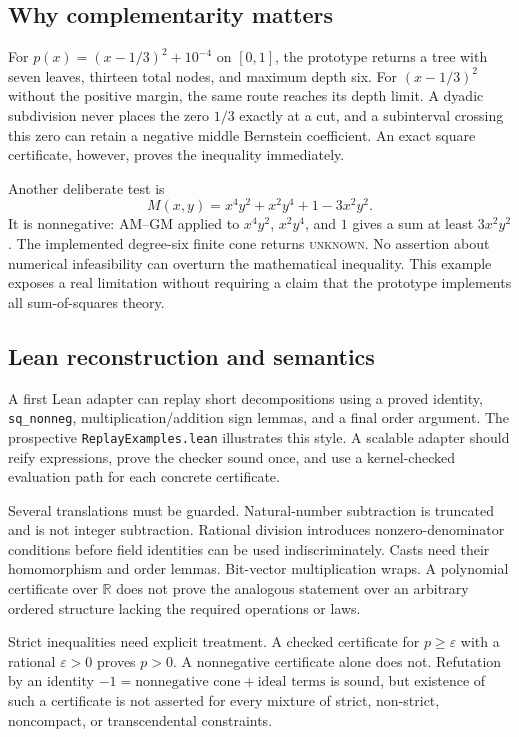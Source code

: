 \documentclass[11pt,letterpaper]{article}
\newcommand{\code}[1]{\texttt{#1}}
\newcommand{\R}{\mathbb{R}}\newcommand{\Z}{\mathbb{Z}}\newcommand{\Q}{\mathbb{Q}}\newcommand{\N}{\mathbb{N}}
\newcommand{\Unknown}{\textsc{unknown}}
\theoremstyle{definition}\newtheorem{definition}[theorem]{Definition}
\theoremstyle{remark}\newtheorem{remark}[theorem]{Remark}
\begin{document}
\subsection{Why complementarity matters}
For $p(x)=(x-1/3)^2+10^{-4}$ on $[0,1]$, the prototype returns a tree with seven leaves, thirteen total nodes, and maximum depth six. For $(x-1/3)^2$ without the positive margin, the same route reaches its depth limit. A dyadic subdivision never places the zero $1/3$ exactly at a cut, and a subinterval crossing this zero can retain a negative middle Bernstein coefficient. An exact square certificate, however, proves the inequality immediately.

Another deliberate test is
\[
 M(x,y)=x^4y^2+x^2y^4+1-3x^2y^2.
\]
It is nonnegative: AM--GM applied to $x^4y^2$, $x^2y^4$, and $1$ gives a sum at least $3x^2y^2$. The implemented degree-six finite cone returns \Unknown. No assertion about numerical infeasibility can overturn the mathematical inequality. This example exposes a real limitation without requiring a claim that the prototype implements all sum-of-squares theory.

\subsection{Lean reconstruction and semantics}
A first Lean adapter can replay short decompositions using a proved identity, \code{sq\_nonneg}, multiplication/addition sign lemmas, and a final order argument. The prospective \code{ReplayExamples.lean} illustrates this style. A scalable adapter should reify expressions, prove the checker sound once, and use a kernel-checked evaluation path for each concrete certificate.

Several translations must be guarded. Natural-number subtraction is truncated and is not integer subtraction. Rational division introduces nonzero-denominator conditions before field identities can be used indiscriminately. Casts need their homomorphism and order lemmas. Bit-vector multiplication wraps. A polynomial certificate over $\R$ does not prove the analogous statement over an arbitrary ordered structure lacking the required operations or laws.

Strict inequalities need explicit treatment. A checked certificate for $p\ge\varepsilon$ with a rational $\varepsilon>0$ proves $p>0$. A nonnegative certificate alone does not. Refutation by an identity $-1=\text{nonnegative cone}+\text{ideal terms}$ is sound, but existence of such a certificate is not asserted for every mixture of strict, non-strict, noncompact, or transcendental constraints.
\end{document}
